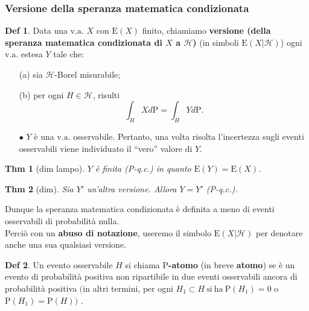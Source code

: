 \documentclass[a4paper,11pt]{article}
\theoremstyle{plain}
\newtheorem{thm}{Thm}[section]
\theoremstyle{definition}
\newtheorem{defn}{Def}[section]
\theoremstyle{remark}
\begin{document}
\subsubsection{Versione della speranza matematica condizionata}
\begin{defn}
Data una  $\mathrm{v}.\mathrm{a}.$  $X$ con $\mathrm{E}(X)$ finito, chiamiamo \textbf{versione (della speranza matematica condizionata di $X$ a $\mathcal{H}$)} (in simboli $\mathrm{E}(X|\mathcal{H})$) ogni $\mathrm{v}.\mathrm{a}$. estesa $Y$ tale che:
\begin{itemize}
\item [(a)] sia $\mathcal{H}$-Borel misurabile;
\item [(b)] per ogni $H\in \mathcal{H}$, risulti
$$
\int_{H}Xd\mathrm{P}=\int_{H}Yd\mathrm{P}.
$$
\end{itemize} 
\end{defn}

\begin{itemize}
    \item[$\bullet$] $Y$ è una $\mathrm{v}.\mathrm{a}.$ osservabile.  Pertanto, una volta risolta l'incertezza sugli eventi osservabili viene individuato il ``vero'' valore di $Y.$  
\end{itemize}


\begin{thm}[dim lampo] $Y$ è finita (P-q.c.) in quanto $\mathrm{E}(Y)=\mathrm{E}(X)$.
\end{thm}
\begin{thm}[dim] Sia $Y'$ un'altra versione. Allora $Y=Y'$ (P-q.c.).
\end{thm}

\noindent
Dunque la speranza matematica condizionata è definita a meno di eventi osservabili di probabilità nulla.\\

\noindent Perciò con un \textbf{abuso di notazione}, useremo il simbolo $\mathrm{E}(X|\mathcal{H})$ per denotare anche una sua qualsiasi versione.


\begin{defn} Un evento osservabile $H$ si chiama \textbf{$\mathrm{P}$-atomo} (in breve \textbf{atomo}) se è un evento di probabilità positiva non ripartibile in due eventi osservabili ancora di probabilità positiva $(\mathrm{i}\mathrm{n}$ altri termini, $\mathrm{p}\mathrm{e}\mathrm{r}$ ogni $H_{1}\subset H\ \mathrm{s}\mathrm{i}\ \mathrm{h}\mathrm{a}\ \mathrm{P}(H_{1})=0$ o $ \mathrm{P}(H_{1})=\mathrm{P}(H))$ .
\end{defn}
\end{document}
